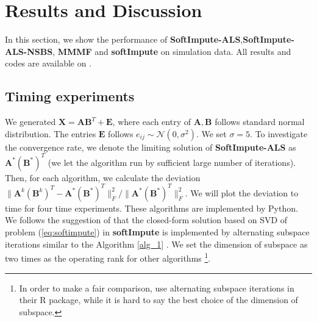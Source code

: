 \documentclass[11pt]{article}
\begin{document}
\section{Results and Discussion}

In this section, we show the performance of \textbf{SoftImpute-ALS},\textbf{SoftImpute-ALS-NSBS}, \textbf{MMMF} and \textbf{softImpute} on simulation data. All results and codes are available on .
\subsection{Timing experiments}
	We generated $\boldsymbol{X} = \boldsymbol{A}\boldsymbol{B}^T+\boldsymbol{E}$, where each entry of $\boldsymbol{A},\boldsymbol{B}$ follows standard normal distribution. The entries  $\boldsymbol{E}$ follows $e_{ij} \sim \mathcal{N}(0,\sigma^2)$. We set $\sigma=5$.
To investigate the convergence rate, we denote the limiting solution of \textbf{SoftImpute-ALS} as $\boldsymbol{A}^*(\boldsymbol{B}^*)^T$ (we let the algorithm run by sufficient large number of iterations). Then, for each algorithm, we calculate the deviation $\|\boldsymbol{A}^k(\boldsymbol{B}^k)^T-\boldsymbol{A}^*(\boldsymbol{B}^*)^T\|_F^2/\|\boldsymbol{A}^*(\boldsymbol{B}^*)^T\|_F^2$. We will plot the deviation to time for four time experiments. These algorithms are implemented by Python.
We follows the suggestion of \cite{hastie2015matrix} that the closed-form solution based on SVD of problem (\ref{eq:softimpute}) in \textbf{softImpute} is implemented by alternating subspace iterations similar to the Algorithm \ref{alg_1}
. We set the dimension of subspace as two times as the operating rank for other algorithms \footnote{In order to make a fair comparison, \cite{hastie2015matrix} use alternating subspace iterations in their R package, while it is hard to say the best choice of the dimension of subspace.}.
\end{document}
